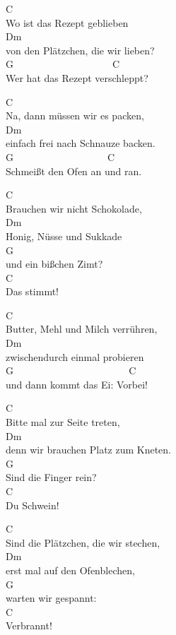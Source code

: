 \documentclass[
  letterpaper,
  twoside=false]{scrbook}
\begin{document}
C\\
Wo ist das Rezept geblieben\\
Dm\\
von den Plätzchen, die wir lieben?\\
G ~ ~ ~ ~ ~ ~ ~ ~ ~ ~ ~ ~C\\
Wer hat das Rezept verschleppt?

C\\
Na, dann müssen wir es packen,\\
Dm\\
einfach frei nach Schnauze backen. ~ ~ ~ ~ ~ ~ ~ ~ ~ ~ ~\\
G ~ ~ ~ ~ ~ ~ ~ ~ ~ ~ ~ C\\
Schmeißt den Ofen an und ran.

C\\
Brauchen wir nicht Schokolade,\\
Dm\\
Honig, Nüsse und Sukkade ~ ~ ~ ~ ~ ~ ~ ~ ~ ~ ~ ~ ~ ~ ~ ~\\
G\\
und ein bißchen Zimt?\\
C\\
Das stimmt!

C\\
Butter, Mehl und Milch verrühren,\\
Dm\\
zwischendurch einmal probieren ~ ~ ~ ~ ~ ~ ~ ~ ~\\
G ~ ~ ~ ~ ~ ~ ~ ~ ~ ~ ~ ~ ~ ~C\\
und dann kommt das Ei: Vorbei!

C\\
Bitte mal zur Seite treten,\\
Dm\\
denn wir brauchen Platz zum Kneten. ~ ~ ~ ~ ~ ~ ~ ~ ~ ~\\
G\\
Sind die Finger rein?\\
C\\
Du Schwein!

C\\
Sind die Plätzchen, die wir stechen,\\
Dm\\
erst mal auf den Ofenblechen, ~ ~ ~ ~ ~ ~ ~ ~ ~ ~ ~ ~ ~\\
G\\
warten wir gespannt:\\
C\\
Verbrannt!
\end{document}
